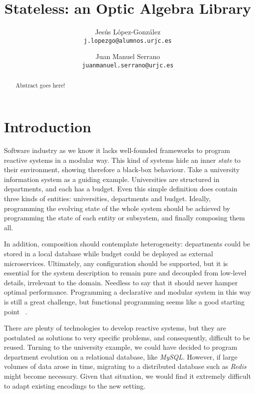 \documentclass{article}
\begin{document}
\lstset{language=scala}

\title{Stateless: an Optic Algebra Library}
\author{
  Jesús López-González\\
  \texttt{j.lopezgo@alumnos.urjc.es}
  \and
  Juan Manuel Serrano\\
  \texttt{juanmanuel.serrano@urjc.es}
}

\maketitle

\begin{abstract}

  Abstract goes here!

\end{abstract}

\section{Introduction}


Software industry as we know it lacks well-founded frameworks to program
reactive systems in a modular way. This kind of systems hide an inner
\emph{state} to their environment, showing therefore a black-box behaviour. Take
a university information system as a guiding example. Universities are
structured in departments, and each has a budget. Even this simple definition
does contain three kinds of entities: universities, departments and budget.
Ideally, programming the evolving state of the whole system should be achieved
by programming the state of each entity or subsystem, and finally composing them
all.

In addition, composition should contemplate heterogeneity: departments could be
stored in a local database while budget could be deployed as external
microservices. Ultimately, any configuration should be supported, but it is
essential for the system description to remain pure and decoupled from low-level
details, irrelevant to the domain. Needless to say that it should never hamper
optimal performance. Programming a declarative and modular system in this way is
still a great challenge, but functional programming seems like a good starting
point ~\cite{hughes1989functional}.


There are plenty of technologies to develop reactive systems, but they are
postulated as solutions to very specific problems, and consequently, difficult
to be reused. Turning to the university example, we could have decided to
program department evolution on a relational database, like \emph{MySQL}.
However, if large volumes of data arose in time, migrating to a distributed
database such as \emph{Redis} might become necessary. Given that situation, we
would find it extremely difficult to adapt existing encodings to the new
setting.
\end{document}
